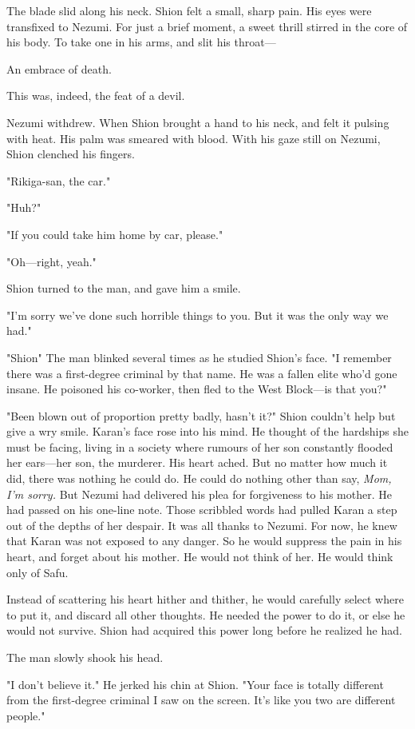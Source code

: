 The blade slid along his neck. Shion felt a small, sharp pain. His eyes
were transfixed to Nezumi. For just a brief moment, a sweet thrill
stirred in the core of his body. To take one in his arms, and slit his
throat---

An embrace of death.

This was, indeed, the feat of a devil.

Nezumi withdrew. When Shion brought a hand to his neck, and felt it
pulsing with heat. His palm was smeared with blood. With his gaze still
on Nezumi, Shion clenched his fingers.

"Rikiga-san, the car."

"Huh?"

"If you could take him home by car, please."

"Oh---right, yeah."

Shion turned to the man, and gave him a smile.

"I'm sorry we've done such horrible things to you. But it was the only
way we had."

"Shion\el " The man blinked several times as he studied Shion's face. "I
remember there was a first-degree criminal by that name. He was a fallen
elite who'd gone insane. He poisoned his co-worker, then fled to the
West Block---is that you?"

"Been blown out of proportion pretty badly, hasn't it?" Shion couldn't
help but give a wry smile. Karan's face rose into his mind. He thought
of the hardships she must be facing, living in a society where rumours
of her son constantly flooded her ears---her son, the murderer. His heart
ached. But no matter how much it did, there was nothing he could do. He
could do nothing other than say, \emph{Mom, I'm sorry.} But Nezumi had
delivered his plea for forgiveness to his mother. He had passed on his
one-line note. Those scribbled words had pulled Karan a step out of the
depths of her despair. It was all thanks to Nezumi. For now, he knew
that Karan was not exposed to any danger. So he would suppress the pain
in his heart, and forget about his mother. He would not think of her. He
would think only of Safu.

Instead of scattering his heart hither and thither, he would carefully
select where to put it, and discard all other thoughts. He needed the
power to do it, or else he would not survive. Shion had acquired this
power long before he realized he had.

The man slowly shook his head.

"I don't believe it." He jerked his chin at Shion. "Your face is totally
different from the first-degree criminal I saw on the screen. It's like
you two are different people."

